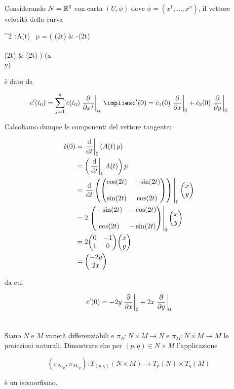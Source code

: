 Considerando $ N = \mathbb{R}^{2} $ con carta $ (U,\phi) $ dove $ \phi = (x^{1},\dots,x^{n}) $, il vettore velocità della curva

%
	{\R}{\R^{2}}%
	{t}{A(t) \, p = \mqty( \cos(2t) & -\sin(2t) \\\\ \sin(2t) & \cos(2t) ) \mqty(x \\ y)}

è dato da

\begin{equation}
	c'(t_{0}) = \sum_{j=1}^{n} \dot{c}(t_{0}) \eval{\pdv{x^{j}}}_{t_{0}}%
	\implies%
	c'(0) = \dot{c}_{1}(0) \eval{\pdv{x}}_{0} + \dot{c}_{2}(0) \eval{\pdv{y}}_{0}
\end{equation}

Calcoliamo dunque le componenti del vettore tangente:

\begin{align}
	\begin{split}
		\dot{c}(0) &= \eval{\dv{t}}_{0}(A(t) \, p)\\
		&= \left( \eval{\dv{t}}_{0} A(t) \right) p\\
		&= \eval{ \dv{t} \left( \mqty( \cos(2t) & -\sin(2t) \\\\ \sin(2t) & \cos(2t) ) \right) }_{0} \mqty(x \\ y)\\
		&= 2 \eval{ \mqty( -\sin(2t) & -\cos(2t) \\\\ \cos(2t) & -\sin(2t) ) }_{0} \mqty(x \\ y)\\
		&= 2 \mqty( 0 & -1 \\ 1 & 0 ) \mqty(x \\ y)\\
		&= \mqty(-2y \\ 2x)
	\end{split}
\end{align}

da cui

\begin{equation}
	c'(0) = -2y \eval{\pdv{x}}_{0} + 2x \eval{\pdv{y}}_{0}
\end{equation}

\tocless\section{}\label{es2-11}

\begin{tcolorbox}
	Siano $ N $ e $ M $ varietà differenziabili e $ \pi_{N} : N \times M \to N $ e $ \pi_{M} : N \times M \to M $ le proiezioni naturali. Dimostrare che per $ (p,q) \in N \times M $ l'applicazione
	
	\begin{equation}
		(\pi_{N_{*p}},\pi_{M_{*p}}) : T_{(p,q)}(N \times M) \to T_{p}(N) \times T_{q}(M)
	\end{equation}
	
	è un isomorfismo.
\end{tcolorbox}


